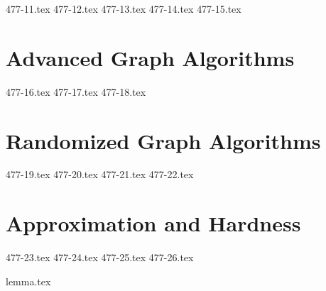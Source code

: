 \documentclass[a4paper]{report}
\begin{document}
{477-11.tex}
{477-12.tex}
{477-13.tex}
{477-14.tex}
{477-15.tex}

\part{Advanced Graph Algorithms}
{477-16.tex}
{477-17.tex}
{477-18.tex}

\part{Randomized Graph Algorithms}

{477-19.tex}
{477-20.tex}
{477-21.tex}
{477-22.tex}

\part{Approximation and Hardness}

{477-23.tex}
{477-24.tex}
{477-25.tex}
{477-26.tex}


\newpage
\appendix
\appendixpage{}

{lemma.tex}
%

\newpage
\pagestyle{plain}
\printbibliography{}
\end{document}
